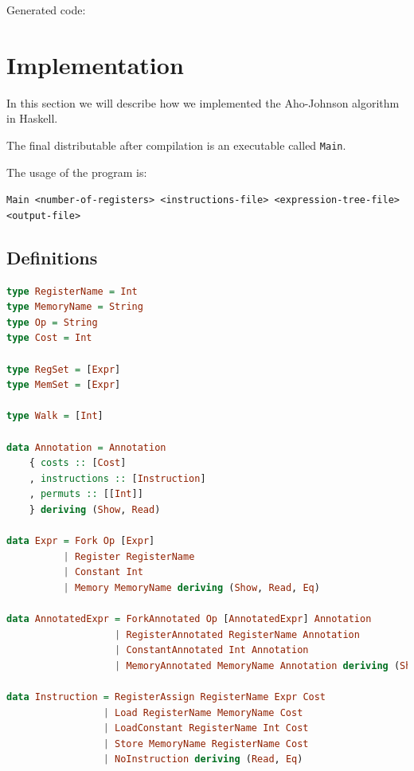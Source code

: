 \documentclass{article}
\begin{document}
Generated code:\\


\section{Implementation}

In this section we will describe how we implemented the Aho-Johnson algorithm in Haskell.
  
The final distributable after compilation is an executable called \texttt{Main}.

The usage of the program is:

\texttt{Main <number-of-registers> <instructions-file> <expression-tree-file> <output-file>}
  
\subsection{Definitions}

\begin{lstlisting}[language=Haskell]
type RegisterName = Int
type MemoryName = String
type Op = String
type Cost = Int

type RegSet = [Expr]
type MemSet = [Expr]

type Walk = [Int]

data Annotation = Annotation
    { costs :: [Cost]
    , instructions :: [Instruction]
    , permuts :: [[Int]]
    } deriving (Show, Read)

data Expr = Fork Op [Expr]
          | Register RegisterName
          | Constant Int
          | Memory MemoryName deriving (Show, Read, Eq)

data AnnotatedExpr = ForkAnnotated Op [AnnotatedExpr] Annotation
                   | RegisterAnnotated RegisterName Annotation
                   | ConstantAnnotated Int Annotation
                   | MemoryAnnotated MemoryName Annotation deriving (Show, Read)

data Instruction = RegisterAssign RegisterName Expr Cost
                 | Load RegisterName MemoryName Cost
                 | LoadConstant RegisterName Int Cost
                 | Store MemoryName RegisterName Cost
                 | NoInstruction deriving (Read, Eq)
\end{lstlisting}
\end{document}
